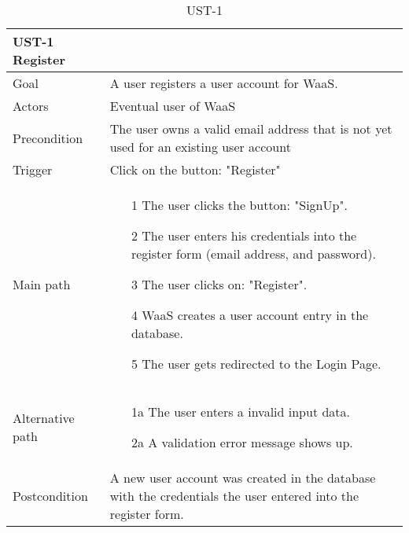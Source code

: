 \documentclass[titlepage, 12pt]{article}
\begin{document}
\begin{table}[H]
  \begin{center}

    \begin{tabular}{p{4cm}|p{10cm}}
      \textbf{UST-1 Register}                                                                                                        \\
      \hline
      Goal             & A user registers a user account for WaaS.                                                                    \\
      \hline
      Actors           & Eventual user of WaaS                                                                                       \\
      \hline
      Precondition     & The user owns a valid email address that is not yet used for an existing user account                        \\
      \hline
      Trigger          & Click on the button: "Register"                                                                             \\
      \hline
      Main path        &
      \begin{itemize}
        \item [1] The user clicks the button: "SignUp".
        \item [2] The user enters his credentials into the register form (email address, and password).
        \item [3] The user clicks on: "Register".
        \item [4] WaaS creates a user account entry in the database.
        \item [5] The user gets redirected to the Login Page.
      \end{itemize}                                                                                                      \\
      \hline
      Alternative path &
      \begin{itemize}
        \item [1a] The user enters a invalid input data.
        \item [2a] A validation error message shows up.
      \end{itemize}                                                                                                      \\
      \hline
      Postcondition    & A new user account was created in the database with the credentials the user entered into the register form. \\
    \end{tabular}

    \caption{UST-1}
    \label{table:UST-1}

  \end{center}
\end{table}
\end{document}
